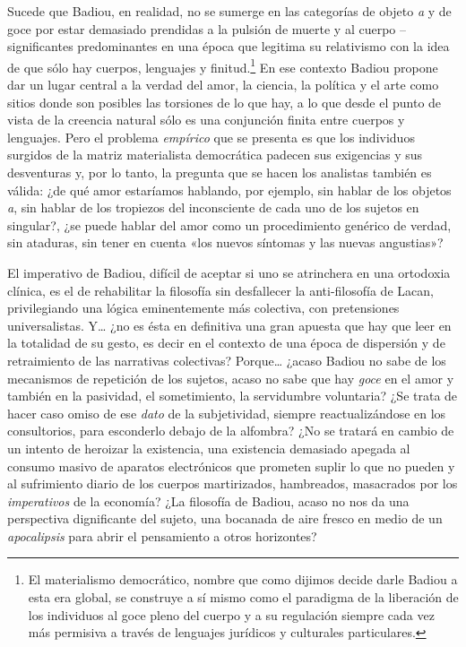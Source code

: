 Sucede que Badiou, en realidad, no se sumerge en las categorías de objeto \emph{a} y de goce por estar demasiado prendidas a la pulsión de muerte y al cuerpo --significantes predominantes en una época que legitima su relativismo con la idea de que sólo hay cuerpos, lenguajes y finitud.\footnote{El materialismo democrático, nombre que como dijimos decide darle Badiou a esta era global, se construye a sí mismo como el paradigma de la liberación de los individuos al goce pleno del cuerpo y a su regulación siempre cada vez más permisiva a través de lenguajes jurídicos y culturales particulares.} En ese contexto Badiou propone dar un lugar central a la verdad del amor, la ciencia, la política y el arte como sitios donde son posibles las torsiones de lo que hay, a lo que desde el punto de vista de la creencia natural sólo es una conjunción finita entre cuerpos y lenguajes. Pero el problema \emph{empírico} que se presenta es que los individuos surgidos de la matriz materialista democrática padecen sus exigencias y sus desventuras y, por lo tanto, la pregunta que se hacen los analistas también es válida: ¿de qué amor estaríamos hablando, por ejemplo, sin hablar de los objetos \emph{a}, sin hablar de los tropiezos del inconsciente de cada uno de los sujetos en singular?, ¿se puede hablar del amor como un procedimiento genérico de verdad, sin ataduras, sin tener en cuenta «los nuevos síntomas y las nuevas angustias»?

El imperativo de Badiou, difícil de aceptar si uno se atrinchera en una ortodoxia clínica, es el de rehabilitar la filosofía sin desfallecer la anti-filosofía de Lacan, privilegiando una lógica eminentemente más colectiva, con pretensiones universalistas. Y\ldots{} ¿no es ésta en definitiva una gran apuesta que hay que leer en la totalidad de su gesto, es decir en el contexto de una época de dispersión y de retraimiento de las narrativas colectivas? Porque\ldots{} ¿acaso Badiou no sabe de los mecanismos de repetición de los sujetos, acaso no sabe que hay \emph{goce} en el amor y también en la pasividad, el sometimiento, la servidumbre voluntaria? ¿Se trata de hacer caso omiso de ese \emph{dato} de la subjetividad, siempre reactualizándose en los consultorios, para esconderlo debajo de la alfombra? ¿No se tratará en cambio de un intento de heroizar la existencia, una existencia demasiado apegada al consumo masivo de aparatos electrónicos que prometen suplir lo que no pueden y al sufrimiento diario de los cuerpos martirizados, hambreados, masacrados por los \emph{imperativos} de la economía? ¿La filosofía de Badiou, acaso no nos da una perspectiva dignificante del sujeto, una bocanada de aire fresco en medio de un \emph{apocalipsis} para abrir el pensamiento a otros horizontes?

